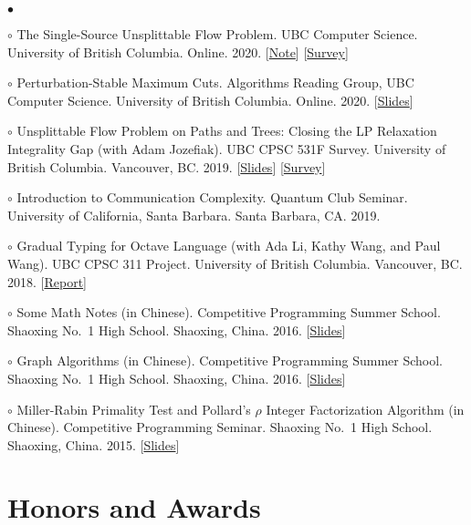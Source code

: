\documentclass[margin,line]{res}
\newenvironment{list2}{
  \begin{list}{$\bullet$}{%
      \setlength{\itemsep}{0in}
      \setlength{\parsep}{0in} \setlength{\parskip}{0in}
      \setlength{\topsep}{0in} \setlength{\partopsep}{0in}
      \setlength{\leftmargin}{0.2in}}}{\end{list}}
\begin{document}
\begin{resume}
\begin{list2}
\item[$\circ$] The Single-Source Unsplittable Flow Problem. UBC Computer Science. University of British Columbia. Online. 2020. [\href{http://ypan.me/docs/ssufp-note.pdf}{Note}] [\href{http://ypan.me/docs/ssufp-survey.pdf}{Survey}]
\item[$\circ$] Perturbation-Stable Maximum Cuts. Algorithms Reading Group, UBC Computer Science. University of British Columbia. Online. 2020. [\href{http://ypan.me/docs/maxcut.pdf}{Slides}]
\item[$\circ$] Unsplittable Flow Problem on Paths and Trees: Closing the LP Relaxation Integrality Gap (with Adam Jozefiak). UBC CPSC 531F Survey. University of British Columbia. Vancouver, BC. 2019. [\href{http://ypan.me/docs/ufp-slides.pdf}{Slides}] [\href{http://ypan.me/docs/ufp-survey.pdf}{Survey}]
\item[$\circ$] Introduction to Communication Complexity. Quantum Club Seminar. University of California, Santa Barbara. Santa Barbara, CA. 2019.
\item[$\circ$] Gradual Typing for Octave Language (with Ada Li, Kathy Wang, and Paul Wang). UBC CPSC 311 Project. University of British Columbia. Vancouver, BC. 2018. [\href{http://ypan.me/docs/gradual-octave.pdf}{Report}]
\item[$\circ$] Some Math Notes (in Chinese). Competitive Programming Summer School. Shaoxing No.\ 1 High School. Shaoxing, China. 2016. [\href{http://ypan.me/docs/math.pdf}{Slides}]
\item[$\circ$] Graph Algorithms (in Chinese). Competitive Programming Summer School. Shaoxing No.\ 1 High School. Shaoxing, China. 2016. [\href{http://ypan.me/docs/graph.pdf}{Slides}]
\item[$\circ$] Miller-Rabin Primality Test and Pollard's $\rho$ Integer Factorization Algorithm (in Chinese). Competitive Programming Seminar. Shaoxing No.\ 1 High School. Shaoxing, China. 2015. [\href{http://ypan.me/docs/miller-rabin-pollard-rho.pdf}{Slides}]
\end{list2}


\section{\sc Honors and Awards}


\end{resume}
\end{document}
